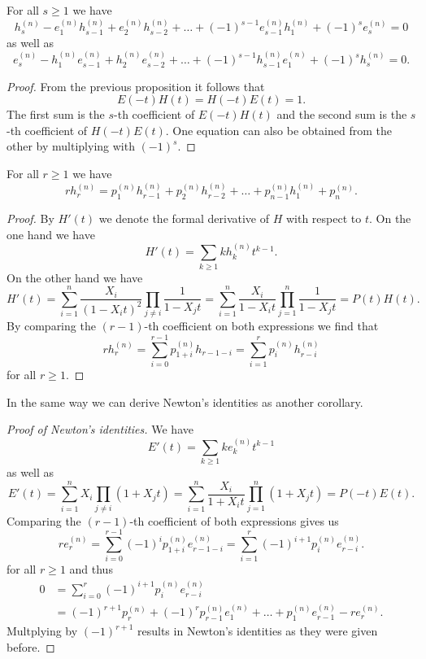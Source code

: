 \begin{cor}
 For all $s \geq 1$ we have
 \[
  h^{(n)}_s - e^{(n)}_1 h^{(n)}_{s-1} + e^{(n)}_2 h^{(n)}_{s-2} + \ldots + (-1)^{s-1} e^{(n)}_{s-1} h^{(n)}_1 + (-1)^s e^{(n)}_s = 0
 \]
 as well as
 \[
  e^{(n)}_s - h^{(n)}_1 e^{(n)}_{s-1} + h^{(n)}_2 e^{(n)}_{s-2} + \ldots + (-1)^{s-1} h^{(n)}_{s-1} e^{(n)}_1 + (-1)^s h^{(n)}_s = 0.
 \]
\end{cor}
\begin{proof}
 From the previous proposition it follows that
 \[
  E(-t)H(t) = H(-t)E(t) = 1.
 \]
 The first sum is the $s$-th coefficient of $E(-t)H(t)$ and the second sum is the $s$-th coefficient of $H(-t)E(t)$. One equation can also be obtained from the other by multiplying with $(-1)^s$.
\end{proof}


\begin{cor}
 For all $r \geq 1$ we have
 \[
  r h^{(n)}_r = p^{(n)}_1 h^{(n)}_{r-1} + p^{(n)}_2 h^{(n)}_{r-2} + \ldots + p^{(n)}_{n-1} h^{(n)}_1 + p^{(n)}_n.
 \]
\end{cor}
\begin{proof}
 By $H'(t)$ we denote the formal derivative of $H$ with respect to $t$. On the one hand we have
 \[
  H'(t) = \sum_{k \geq 1} k h^{(n)}_k t^{k-1}.
 \]
 On the other hand we have
 \[
  H'(t) = \sum_{i=1}^n \frac{X_i}{(1-X_i t)^2} \prod_{j \neq i} \frac{1}{1 - X_j t}
  = \sum_{i=1}^n \frac{X_i}{1 - X_i t} \prod_{j=1}^n \frac{1}{1 - X_j t}
  = P(t) H(t).
 \]
 By comparing the $(r-1)$-th coefficient on both expressions we find that
 \[
  r h^{(n)}_r = \sum_{i=0}^{r-1} p^{(n)}_{1+i} h_{r-1-i} = \sum_{i=1}^r p^{(n)}_i h^{(n)}_{r-i}
 \]
 for all $r \geq 1$.
\end{proof}


In the same way we can derive Newton’s identities as another corollary.


\begin{proof}[Proof of Newton’s identities]
 We have
 \[
  E'(t) = \sum_{k \geq 1} k e^{(n)}_k t^{k-1}
 \]
 as well as
 \[
  E'(t)
  = \sum_{i=1}^n X_i \prod_{j \neq i} (1 + X_j t)
  = \sum_{i=1}^n \frac{X_i}{1 + X_i t} \prod_{j=1}^n (1 + X_j t)
  = P(-t)E(t).
 \]
 Comparing the $(r-1)$-th coefficient of both expressions gives us
 \[
  r e^{(n)}_r
  = \sum_{i=0}^{r-1} (-1)^i p^{(n)}_{1+i} e^{(n)}_{r-1-i}
  = \sum_{i=1}^r (-1)^{i+1} p^{(n)}_i e^{(n)}_{r-i}.
 \]
 for all $r \geq 1$ and thus
 \begin{align*}
  0
  &= \sum_{i=0}^r (-1)^{i+1} p^{(n)}_i e^{(n)}_{r-i} \\
  &= (-1)^{r+1} p^{(n)}_r + (-1)^r p^{(n)}_{r-1} e^{(n)}_1 + \ldots + p^{(n)}_1 e^{(n)}_{r-1} - r e^{(n)}_r.
 \end{align*}
 Multplying by $(-1)^{r+1}$ results in Newton’s identities as they were given before.
\end{proof}



